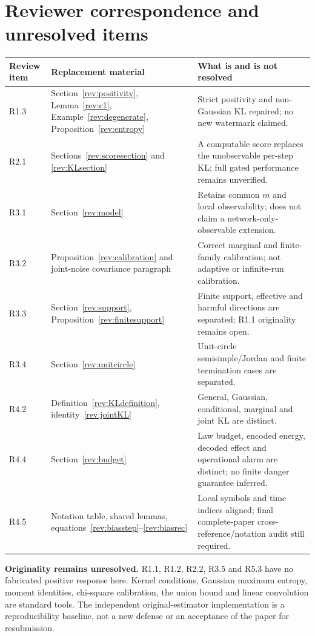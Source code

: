 \documentclass[11pt,a4paper]{article}
\begin{document}
\section*{Reviewer correspondence and unresolved items}
\begin{longtable}{p{}p{}p{}}
\toprule
Review item & Replacement material & What is and is not resolved\\
\midrule\endhead
R1.3 & Section~\ref{rev:positivity}, Lemma~\ref{rev:c1},
Example~\ref{rev:degenerate}, Proposition~\ref{rev:entropy}
& Strict positivity and non-Gaussian KL repaired; no new watermark claimed.\\
R2.1 & Sections~\ref{rev:scoresection} and \ref{rev:KLsection}
& A computable score replaces the unobservable per-step KL; full
gated performance remains unverified.\\
R3.1 & Section~\ref{rev:model}
& Retains common $m$ and local observability; does not claim a
network-only-observable extension.\\
R3.2 & Proposition~\ref{rev:calibration} and joint-noise covariance paragraph
& Correct marginal and finite-family calibration; not adaptive or infinite-run calibration.\\
R3.3 & Section~\ref{rev:support}, Proposition~\ref{rev:finitesupport}
& Finite support, effective and harmful directions are separated;
R1.1 originality remains open.\\
R3.4 & Section~\ref{rev:unitcircle}
& Unit-circle semisimple/Jordan and finite termination cases are separated.\\
R4.2 & Definition~\eqref{rev:KLdefinition}, identity~\eqref{rev:jointKL}
& General, Gaussian, conditional, marginal and joint KL are distinct.\\
R4.4 & Section~\ref{rev:budget}
& Law budget, encoded energy, decoded effect and operational alarm
are distinct; no finite danger guarantee inferred.\\
R4.5 & Notation table, shared lemmas, equations~\eqref{rev:biasstep}--\eqref{rev:biasrec}
& Local symbols and time indices aligned; final complete-paper
cross-reference/notation audit still required.\\
\bottomrule
\end{longtable}

\noindent\textbf{Originality remains unresolved.}
R1.1, R1.2, R2.2, R3.5 and R5.3 have no fabricated positive response here.
Kernel conditions, Gaussian maximum entropy, moment identities, chi-square
calibration, the union bound and linear convolution are standard tools.
The independent original-estimator implementation is a reproducibility
baseline, not a new defense or an acceptance of the paper for resubmission.
\end{document}
